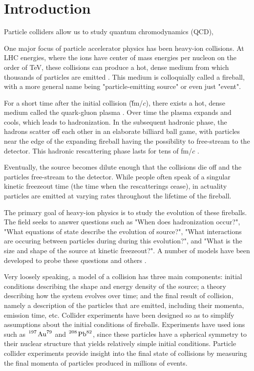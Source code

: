 \section{Introduction}


Particle colliders allow us to study quantum chromodynamics (QCD), 


One major focus of particle accelerator physics has been heavy-ion collisions.
At LHC energies, where the ions have center of mass energies per nucleon on the order of TeV, these collisions can produce a hot, dense medium from which thousands of particles are emitted \cite{...}.
This medium is colloquially called a fireball, with a more general name being "particle-emitting source" or even just "event". 

For a short time after the initial collision (\~fm/$c$), there exists a hot, dense medium called the quark-gluon plasma \cite{...}.
Over time the plasma expands and cools, which leads to hadronization.
In the subsequent hadronic phase, the hadrons scatter off each other in an elaborate billiard ball game, with particles near the edge of the expanding fireball having the possibility to free-stream to the detector.
This hadronic rescattering phase lasts for tens of fm/$c$ \cite{...}.

Eventually, the source becomes dilute enough that the collisions die off and the particles free-stream to the detector.
While people often speak of a singular kinetic freezeout time (the time when the rescatterings cease), in actuality particles are emitted at varying rates throughout the lifetime of the fireball.


The primary goal of heavy-ion physics is to study the evolution of these fireballs.
The field seeks to answer questions such as "When does hadronization occur?", "What equations of state describe the evolution of source?", "What interactions are occuring between particles during during this evolution?", and "What is the size and shape of the source at kinetic freezeout?".
A number of models have been developed to probe these questions and others \cite{...,...,...,...}.

Very loosely speaking, a model of a collision has three main components: initial conditions describing the shape and energy density of the source; a theory describing how the system evolves over time; and the final result of collision, namely a description of the particles that are emitted, including their momenta, emission time, etc.
Collider experiments have been designed so as to simplify assumptions about the initial conditions of fireballs.
Experiments have used ions such as $\ce{^197 \mathrm{Au}^79}$ and $\ce{^208 \mathrm{Pb}^82}$, since these particles have a spherical symmetry to their nuclear structure that yields relatively simple initial conditions.
Particle collider experiments provide insight into the final state of collisions by measuring the final momenta of particles produced in millions of events.



